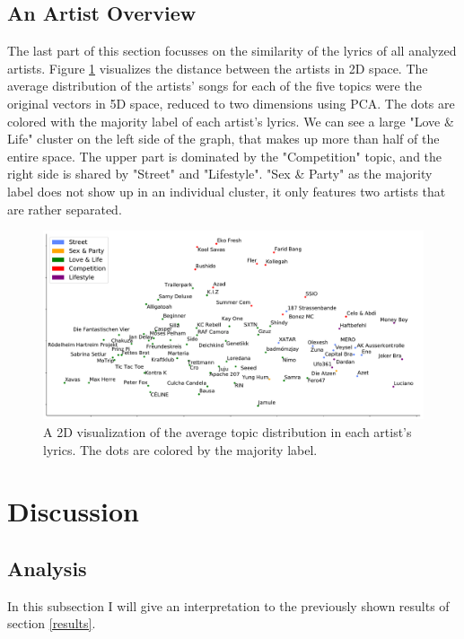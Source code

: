 \documentclass[conference]{IEEEtran}
\begin{document}
\subsection{An Artist Overview}
The last part of this section focusses on the similarity of the lyrics of all analyzed artists. Figure \ref{fig:scatter} visualizes the distance between the artists in 2D space. The average distribution of the artists' songs for each of the five topics were the original vectors in 5D space, reduced to two dimensions using PCA. The dots are colored with the majority label of each artist's lyrics. We can see a large "Love \& Life" cluster on the left side of the graph, that makes up more than half of the entire space. The upper part is dominated by the "Competition" topic, and the right side is shared by "Street" and "Lifestyle". "Sex \& Party" as the majority label does not show up in an individual cluster, it only features two artists that are rather separated.

\begin{figure}[!t]
\includegraphics[width=\linewidth]{figures/scatter.pdf}
\vspace*{-8mm}
\caption{A 2D visualization of the average topic distribution in each artist's lyrics. The dots are colored by the majority label.}
\label{fig:scatter}
\end{figure}

\section{Discussion}
\subsection{Analysis}
In this subsection I will give an interpretation to the previously shown results of section \ref{results}.
\end{document}
